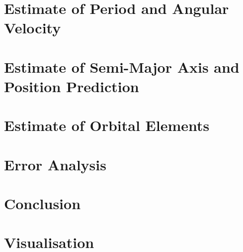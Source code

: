\documentclass{article}
\begin{document}



\section{Estimate of Period and Angular Velocity}

\section{Estimate of Semi-Major Axis and Position Prediction}

\section{Estimate of Orbital Elements}

\section{Error Analysis}

\section{Conclusion}

\section{Visualisation}

\printbibliography
\end{document}
